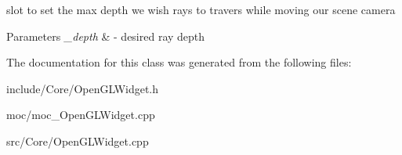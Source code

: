 slot to set the max depth we wish rays to travers while moving our scene camera 


\begin{DoxyParams}{Parameters}
{\em \-\_\-depth} & -\/ desired ray depth \\
\hline
\end{DoxyParams}


The documentation for this class was generated from the following files\-:\begin{DoxyCompactItemize}
\item 
include/\-Core/Open\-G\-L\-Widget.\-h\item 
moc/moc\-\_\-\-Open\-G\-L\-Widget.\-cpp\item 
src/\-Core/Open\-G\-L\-Widget.\-cpp\end{DoxyCompactItemize}
